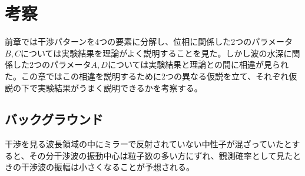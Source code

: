 \section{考察}
前章では干渉パターンを4つの要素に分解し、位相に関係した2つのパラメータ$B,C$については実験結果を理論がよく説明することを見た。しかし波の水深に関係した2つのパラメータ$A,D$については実験結果と理論との間に相違が見られた。この章ではこの相違を説明するために2つの異なる仮説を立て、それぞれ仮説の下で実験結果がうまく説明できるかを考察する。

\subsection{バックグラウンド}
干渉を見る波長領域の中にミラーで反射されていない中性子が混ざっていたとすると、その分干渉波の振動中心は粒子数の多い方にずれ、観測確率として見たときの干渉波の振幅は小さくなることが予想される。

